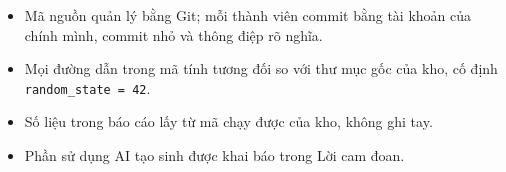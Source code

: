 \documentclass[12pt,a4paper,oneside]{report}
\begin{document}
\begin{itemize}
  \item Mã nguồn quản lý bằng Git; mỗi thành viên commit bằng tài khoản của chính mình, commit nhỏ và thông điệp rõ nghĩa.
  \item Mọi đường dẫn trong mã tính tương đối so với thư mục gốc của kho, cố định \texttt{random\_\allowbreak state = 42}.
  \item Số liệu trong báo cáo lấy từ mã chạy được của kho, không ghi tay.
  \item Phần sử dụng AI tạo sinh được khai báo trong Lời cam đoan.
\end{itemize}
\end{document}
